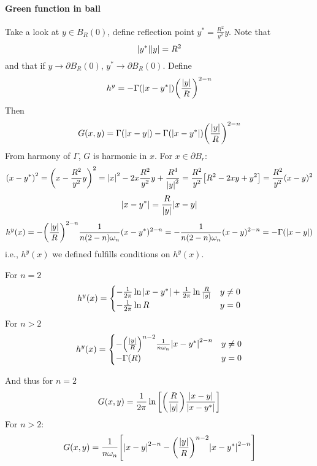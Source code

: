 \paragraph{Green function in ball}
Take a look at $y\in B_R(0)$, define reflection point $y^* = \frac{R^2}{y^2}y$. Note that
$$\abs{y^*}\abs{y} = R^2$$
and that if $y\to \partial B_R(0)$, $y^{*}\to \partial B_R(0)$.
Define
$$h^y = -\Gamma\qty(\abs{x-y^*}) \qty(\frac{\abs{y}}{R})^{2-n}$$
Then
$$G(x,y) =\Gamma(\abs{x-y}) -\Gamma\qty(\abs{x-y^*}) \qty(\frac{\abs{y}}{R})^{2-n}$$
From harmony of $\Gamma$, $G$ is harmonic in $x$. For $x \in \partial B_r$:
$$\qty(x-y^*)^2 = \qty(x - \frac{R^2}{y^2}y)^2 = \abs{x}^2 - 2x\frac{R^2}{y^2}y + \frac{R^4}{\abs{y}^2} = \frac{R^2}{y^2} \qty[R^2 - 2xy + y^2] = \frac{R^2}{y^2} (x-y)^2$$
$$\abs{x-y^*} = \frac{R}{\abs{y}} \abs{x-y}  $$
$$h^y(x) = - \qty(\frac{\abs{y}}{R})^{2-n} \frac{1}{n(2-n)\omega_n}(x-y^*)^{2-n} = -\frac{1}{n(2-n)\omega_n} (x-y)^{2-n} = -\Gamma(\abs{x-y})$$
i.e., $h^y(x)$ we defined fulfills conditions on $h^y(x)$.

For $n=2$
$$h^y(x) = \begin{cases}
-\frac{1}{2\pi} \ln \abs{x-y^*} +\frac{1}{2\pi} \ln \frac{R}{\abs{y}} & y\neq0\\
- \frac{1}{2\pi} \ln R & y=0
\end{cases}$$
For $n>2$
$$h^y(x) = \begin{cases}
- \qty(\frac{\abs{y}}{R})^{n-2} \frac{1}{n\omega_n} \abs{x-y^*}^{2-n} & y\neq0\\
- \Gamma(R) & y=0
\end{cases}$$

And thus for $n=2$
$$G(x,y) = \frac{1}{2\pi} \ln\qty[\qty(\frac{R}{\abs{y}}) \frac{\abs{x-y}}{\abs{x-y^*}}]$$
For $n>2$:
$$G(x,y) = \frac{1}{n\omega_n} \qty[ \abs{x-y}^{2-n} - \qty(\frac{\abs{y}}{R})^{n-2} \abs{x-y^*}^{2-n}]$$